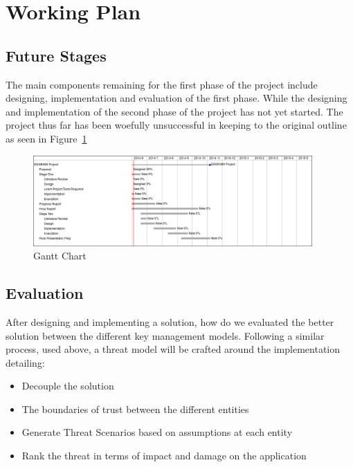 \documentclass[11pt, a4paper, notitlepage]{article}
\begin{document}
\section{Working Plan}
\subsection*{Future Stages}
The main components remaining for the first phase of the project include designing, implementation and evaluation of the first phase. While the designing and implementation of the second phase of the project has not yet started. The project thus far has been woefully unsuccessful in keeping to the original outline as seen in Figure~\ref{gantt}

\begin{figure}[h!]
    \centering
    \includegraphics[width=0.95\textwidth]{gannt.png}
    \caption{Gantt Chart}
    \label{gantt}
\end{figure}

\subsection*{Evaluation}
After designing and implementing a solution, how do we evaluated the better solution between the different key management models. Following a similar process, used above, a threat model will be crafted around the implementation detailing:
\begin{itemize}
\item Decouple the solution
\item The boundaries of trust between the different entities
\item Generate Threat Scenarios based on assumptions at each entity
\item Rank the threat in terms of impact and damage on the application
\end{itemize}




\backmatter



\end{document}
